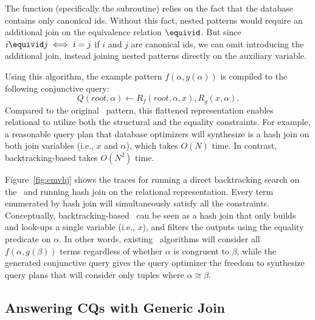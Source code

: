 The \compile{} function (specifically the \aux{} subroutine) relies on
 the fact that the database contains only canonical \eclass ids.
Without this fact, nested patterns would require an additional join
 on the equivalence relation $\equivid$.
But since $i \equivid j \iff i = j$
 if $i$ and $j$ are canonical \eclass ids,
 we can omit introducing the additional join,
 instead joining nested patterns directly on the auxiliary variable.

Using this algorithm, the example pattern $f(\alpha, g(\alpha))$ is compiled to
the following conjunctive query:
\begin{equation}
  \label{eqn:nonlinear-cq}
  Q(\mathit{root},\alpha)\gets
  R_f(\mathit{root},\alpha,x),R_g(x,\alpha).
\end{equation}
Compared to the original
\ematching~pattern, this flattened representation enables relational \ematching to
utilize both the structural and the equality constraints. For example, a reasonable
query plan that database optimizers will synthesize is a hash join
on both join variables (i.e., $x$ and $\alpha$), which takes
$O(N)$ time. In contrast, backtracking-based \ematching{} takes $O(N^2)$ time.

Figure~\ref{fig:emvhj} shows the traces for running a direct backtracking search on the
\egraph~and running hash join on the relational representation.
Every term enumerated by hash join will simultaneously satisfy all the constraints.
Conceptually, backtracking-based \ematching~can be seen as a hash join that only builds and
look-ups a single variable (i.e., $x$),
 and filters the outputs using the equality predicate on $\alpha$.
In other words, existing \ematching~algorithms
 will consider all $f(\alpha, g(\beta))$ terms regardless of whether $\alpha$ is congruent
 to $\beta$,
 while the generated conjunctive query gives the query optimizer the
 freedom to synthesize query plans that will consider only tuples where $\alpha\cong\beta$.

\subsection{Answering CQs with Generic Join}




